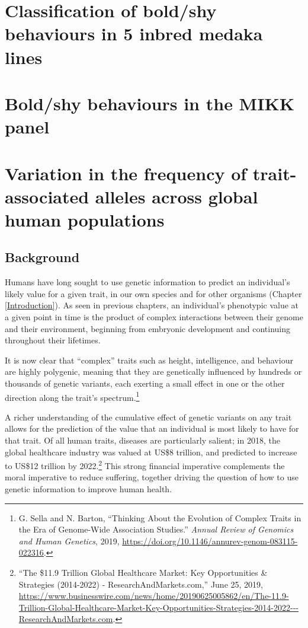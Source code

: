\documentclass[
]{book}
\begin{document}
\hypertarget{Pilot-chap}{%
\chapter{Classification of bold/shy behaviours in 5 inbred medaka lines}\label{Pilot-chap}}

\hypertarget{MIKK-F2-chap}{%
\chapter{Bold/shy behaviours in the MIKK panel}\label{MIKK-F2-chap}}

\hypertarget{Fst-chap}{%
\chapter{Variation in the frequency of trait-associated alleles across global human populations}\label{Fst-chap}}

\hypertarget{Fst-background}{%
\section{Background}\label{Fst-background}}

Humans have long sought to use genetic information to predict an individual's likely value for a given trait, in our own species and for other organisms (Chapter \ref{Introduction}). As seen in previous chapters, an individual's phenotypic value at a given point in time is the product of complex interactions between their genome and their environment, beginning from embryonic development and continuing throughout their lifetimes.

It is now clear that ``complex'' traits such as height, intelligence, and behaviour are highly polygenic, meaning that they are genetically influenced by hundreds or thousands of genetic variants, each exerting a small effect in one or the other direction along the trait's spectrum.\footnote{G. Sella and N. Barton, {``Thinking {About} the {Evolution} of {Complex Traits} in the {Era} of {Genome-Wide Association Studies}.''} \emph{Annual Review of Genomics and Human Genetics}, 2019, \url{https://doi.org/10.1146/annurev-genom-083115-022316}.}

A richer understanding of the cumulative effect of genetic variants on any trait allows for the prediction of the value that an individual is most likely to have for that trait. Of all human traits, diseases are particularly salient; in 2018, the global healthcare industry was valued at US\$8 trillion, and predicted to increase to US\$12 trillion by 2022.\footnote{{``The \$11.9 {Trillion Global Healthcare Market}: {Key Opportunities} \& {Strategies} (2014-2022) - {ResearchAndMarkets}.com,''} June 25, 2019, \url{https://www.businesswire.com/news/home/20190625005862/en/The-11.9-Trillion-Global-Healthcare-Market-Key-Opportunities-Strategies-2014-2022---ResearchAndMarkets.com}.} This strong financial imperative complements the moral imperative to reduce suffering, together driving the question of how to use genetic information to improve human health.
\end{document}

